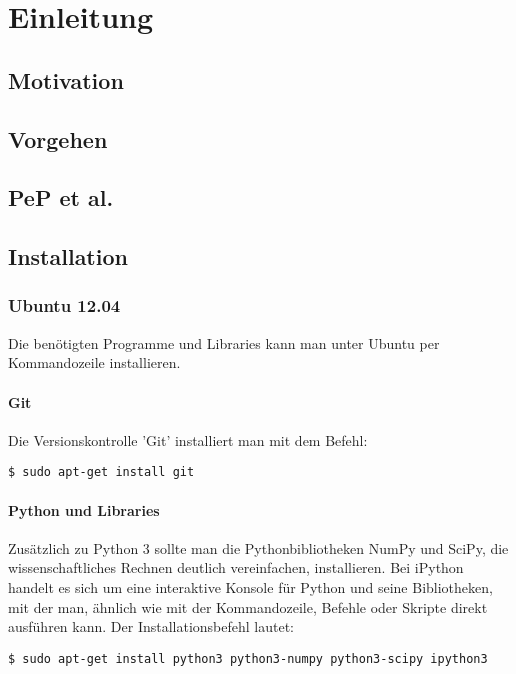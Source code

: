 


\mytitle{\today}
\newpage
\tableofcontents

\chapter{Einleitung}
\section{Motivation}
\section{Vorgehen}
\section{PeP et al.}

\section{Installation}

\subsection{Ubuntu 12.04}
Die benötigten Programme und Libraries kann man unter Ubuntu per Kommandozeile installieren.

\subsubsection{Git}
Die Versionskontrolle 'Git' installiert man mit dem Befehl:
\begin{verbatim}
$ sudo apt-get install git
\end{verbatim}

\subsubsection{Python und Libraries}
Zusätzlich zu Python 3 sollte man die Pythonbibliotheken NumPy und SciPy, die wissenschaftliches Rechnen deutlich vereinfachen, installieren.
Bei iPython handelt es sich um eine interaktive Konsole für Python und seine Bibliotheken, mit der man, ähnlich wie mit der Kommandozeile, Befehle oder Skripte direkt ausführen kann.
Der Installationsbefehl lautet:
\begin{verbatim}
$ sudo apt-get install python3 python3-numpy python3-scipy ipython3
\end{verbatim}

